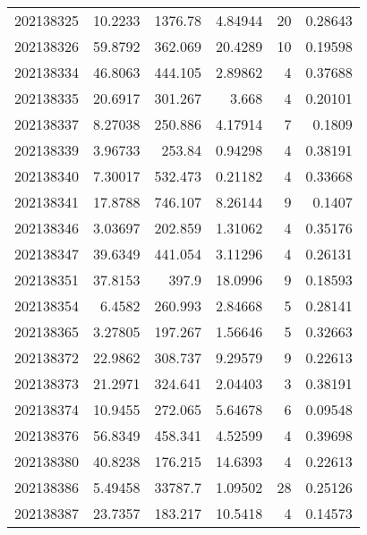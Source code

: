 \begin{tabular}{rrrrrr}
 202138325 &         10.2233  &     1376.78   &            4.84944 &          20 & 0.28643 \\
 202138326 &         59.8792  &      362.069  &           20.4289  &          10 & 0.19598 \\
 202138334 &         46.8063  &      444.105  &            2.89862 &           4 & 0.37688 \\
 202138335 &         20.6917  &      301.267  &            3.668   &           4 & 0.20101 \\
 202138337 &          8.27038 &      250.886  &            4.17914 &           7 & 0.1809  \\
 202138339 &          3.96733 &      253.84   &            0.94298 &           4 & 0.38191 \\
 202138340 &          7.30017 &      532.473  &            0.21182 &           4 & 0.33668 \\
 202138341 &         17.8788  &      746.107  &            8.26144 &           9 & 0.1407  \\
 202138346 &          3.03697 &      202.859  &            1.31062 &           4 & 0.35176 \\
 202138347 &         39.6349  &      441.054  &            3.11296 &           4 & 0.26131 \\
 202138351 &         37.8153  &      397.9    &           18.0996  &           9 & 0.18593 \\
 202138354 &          6.4582  &      260.993  &            2.84668 &           5 & 0.28141 \\
 202138365 &          3.27805 &      197.267  &            1.56646 &           5 & 0.32663 \\
 202138372 &         22.9862  &      308.737  &            9.29579 &           9 & 0.22613 \\
 202138373 &         21.2971  &      324.641  &            2.04403 &           3 & 0.38191 \\
 202138374 &         10.9455  &      272.065  &            5.64678 &           6 & 0.09548 \\
 202138376 &         56.8349  &      458.341  &            4.52599 &           4 & 0.39698 \\
 202138380 &         40.8238  &      176.215  &           14.6393  &           4 & 0.22613 \\
 202138386 &          5.49458 &    33787.7    &            1.09502 &          28 & 0.25126 \\
 202138387 &         23.7357  &      183.217  &           10.5418  &           4 & 0.14573 \\

\end{tabular}
